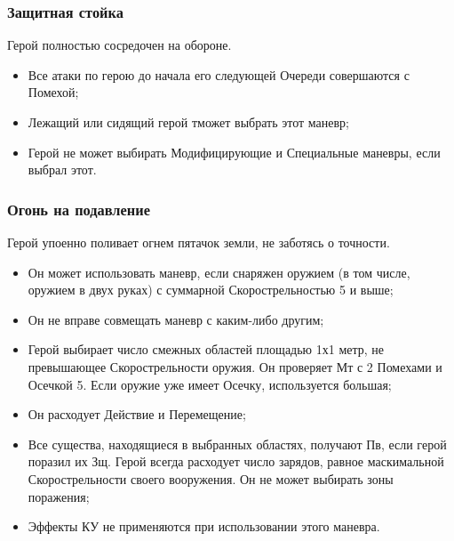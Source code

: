 \subsubsection{Защитная стойка}
Герой полностью сосредочен на обороне.
\begin{itemize}
  \item Все атаки по герою до начала его следующей Очереди совершаются с Помехой;
  \item Лежащий или сидящий герой тможет выбрать этот маневр;
  \item Герой не может выбирать Модифицирующие и Специальные  маневры, если выбрал этот. 
\end{itemize}

\subsubsection{Огонь на подавление}
Герой упоенно поливает огнем пятачок земли, не заботясь о точности.
\begin{itemize}
  \item Он может использовать маневр, если снаряжен оружием (в том числе, оружием в двух руках) с суммарной Скорострельностью 5 и выше;
  \item Он не вправе совмещать маневр с каким-либо другим;
  \item Герой выбирает число смежных областей площадью 1х1 метр, не превышающее Скорострельности оружия. Он проверяет Мт с 2 Помехами и Осечкой 5. Если оружие уже имеет Осечку, используется большая;
  \item Он расходует Действие и Перемещение;
  \item Все существа, находящиеся в выбранных областях, получают Пв, если герой поразил их Зщ. Герой всегда расходует число зарядов, равное маскимальной Скорострельности своего вооружения. Он не может выбирать зоны поражения;
  \item Эффекты КУ не применяются при использовании этого маневра.
\end{itemize}

